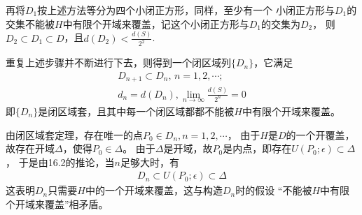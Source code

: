 \documentclass{article}
\begin{document}
再将$D_1$按上述方法等分为四个小闭正方形，同样，至少有一个
小闭正方形与$D_1$的交集不能被$H$中有限个开域来覆盖，记这个小闭正方形与$D_1$的交集为$D_2$，
则$D_2 \subset D_1 \subset D$，且$d(D_2) < \frac{d(S)}{2^2}$.

重复上述步骤并不断进行下去，则得到一个闭区域列$\{D_n\}$，它满足
\begin{align*}
  D_{n+1} \subset D_n, \, n = 1, 2, \cdots ; \\
  d_n = d(D_n), \lim\limits_{n \to \infty} \frac{d(S)}{2^n} = 0
\end{align*}
即$\{D_n\}$是闭区域套，且其中每一个闭区域都都不能被$H$中有限个开域来覆盖。

由闭区域套定理，存在唯一的点$P_0 \in D_n, n = 1, 2, \cdots$，
由于$H$是$D$的一个开覆盖，故存在开域$\Delta$，使得$P_0 \in \Delta$。
由于$\Delta$是开域，故$P_0$是内点，即存在$U(P_0; \epsilon) \subset \Delta$，
于是由16.2的推论，当$n$足够大时，有
\begin{align*}
  D_n \subset U(P_0; \epsilon) \subset \Delta
\end{align*}
这表明$D_n$只需要$H$中的一个开域来覆盖，这与构造$D_n$时的假设
“不能被$H$中有限个开域来覆盖”相矛盾。
\end{document}
